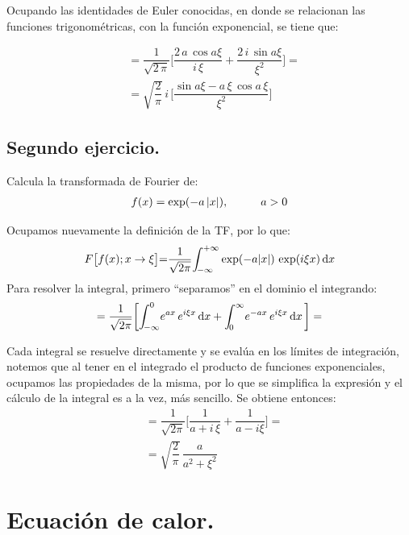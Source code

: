 Ocupando las identidades de Euler conocidas, en donde se relacionan las funciones trigonométricas, con la función exponencial, se tiene que:

\begin{align*}
&= \dfrac{1}{\sqrt{2 \, \pi}} \bigg[ \dfrac{2 \, a \, \cos a \xi}{i \, \xi} + \dfrac{2 \, i \, \sin a \xi}{\xi^{2}} \bigg] = \\[1em] 
&= \sqrt{\dfrac{2}{\pi}} \, i \, \bigg[ \dfrac{\sin a \xi - a \, \xi \, \cos a \, \xi}{\xi^{2}} \bigg]
\end{align*}

\subsection*{Segundo ejercicio.}

Calcula la transformada de Fourier de:
\begin{align*}
f(x) = \exp(-a \, \abs{x}), \hspace{1cm} a > 0
\end{align*}

Ocupamos nuevamente la definición de la TF, por lo que:
\begin{align*}
F \big[ f(x); x \to \xi \big] {=} \dfrac{1}{\sqrt{2 \pi}} \scaleint{5ex}_{\bs -\infty}^{+\infty} \exp(-a \abs{x}) \, \exp(i \xi x) \dd{x}
\end{align*}
Para resolver la integral, primero \enquote{separamos} en el dominio el integrando:
\begin{align*}
= \dfrac{1}{\sqrt{2 \pi}} \bigg[ \scaleint{5ex}_{\bs -\infty}^{0} e^{ a  x} \, e^{i \xi x} \dd{x} + \scaleint{5ex}_{\bs 0}^{\infty} e^{ -a  x} \, e^{i \xi x} \dd{x} \bigg] =
\end{align*}

Cada integral se resuelve directamente y se evalúa en los límites de integración, notemos que al tener en el integrado el producto de funciones exponenciales, ocupamos las propiedades de la misma, por lo que se simplifica la expresión y el cálculo de la integral es a la vez, más sencillo. Se obtiene entonces:
\begin{align*}
&= \dfrac{1}{\sqrt{2 \pi}} \bigg[ \dfrac{1}{a + i \, \xi} + \dfrac{1}{a - i \xi} \bigg] = \\[0.5em] 
&= \sqrt{\dfrac{2}{\pi}} \, \dfrac{a}{a^{2} + \xi^{2}}
\end{align*}

\section{Ecuación de calor.}
